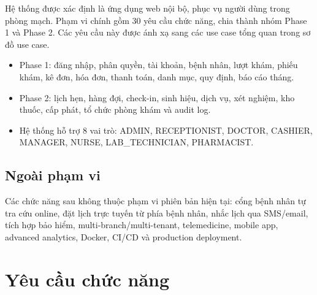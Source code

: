 Hệ thống được xác định là ứng dụng web nội bộ, phục vụ người dùng trong phòng mạch. Phạm vi chính gồm 30 yêu cầu chức năng, chia thành nhóm Phase 1 và Phase 2. Các yêu cầu này được ánh xạ sang các use case tổng quan trong sơ đồ use case.

\begin{itemize}
    \item Phase 1: đăng nhập, phân quyền, tài khoản, bệnh nhân, lượt khám, phiếu khám, kê đơn, hóa đơn, thanh toán, danh mục, quy định, báo cáo tháng.
    \item Phase 2: lịch hẹn, hàng đợi, check-in, sinh hiệu, dịch vụ, xét nghiệm, kho thuốc, cấp phát, tổ chức phòng khám và audit log.
    \item Hệ thống hỗ trợ 8 vai trò: ADMIN, RECEPTIONIST, DOCTOR, CASHIER, MANAGER, NURSE, LAB\_TECHNICIAN, PHARMACIST.
\end{itemize}

\subsection{Ngoài phạm vi}

Các chức năng sau không thuộc phạm vi phiên bản hiện tại: cổng bệnh nhân tự tra cứu online, đặt lịch trực tuyến từ phía bệnh nhân, nhắc lịch qua SMS/email, tích hợp bảo hiểm, multi-branch/multi-tenant, telemedicine, mobile app, advanced analytics, Docker, CI/CD và production deployment.

\section{Yêu cầu chức năng}


